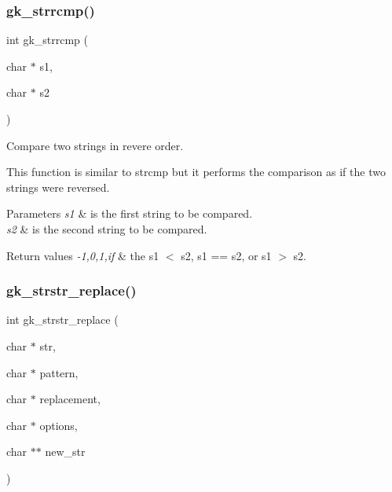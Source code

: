 \subsubsection{\texorpdfstring{gk\+\_\+strrcmp()}{gk\_strrcmp()}}
{\footnotesize\ttfamily int gk\+\_\+strrcmp (\begin{DoxyParamCaption}\item[{char $\ast$}]{s1,  }\item[{char $\ast$}]{s2 }\end{DoxyParamCaption})}



Compare two strings in revere order. 

This function is similar to strcmp but it performs the comparison as if the two strings were reversed.


\begin{DoxyParams}{Parameters}
{\em s1} & is the first string to be compared. \\
\hline
{\em s2} & is the second string to be compared. \\
\hline
\end{DoxyParams}

\begin{DoxyRetVals}{Return values}
{\em -\/1,0,1,if} & the s1 $<$ s2, s1 == s2, or s1 $>$ s2. \\
\hline
\end{DoxyRetVals}
\mbox{\label{a00077_a46e5cf8f76a1ece74adf1b8b9dfcb275}} 
\subsubsection{\texorpdfstring{gk\+\_\+strstr\+\_\+replace()}{gk\_strstr\_replace()}}
{\footnotesize\ttfamily int gk\+\_\+strstr\+\_\+replace (\begin{DoxyParamCaption}\item[{char $\ast$}]{str,  }\item[{char $\ast$}]{pattern,  }\item[{char $\ast$}]{replacement,  }\item[{char $\ast$}]{options,  }\item[{char $\ast$$\ast$}]{new\+\_\+str }\end{DoxyParamCaption})}



